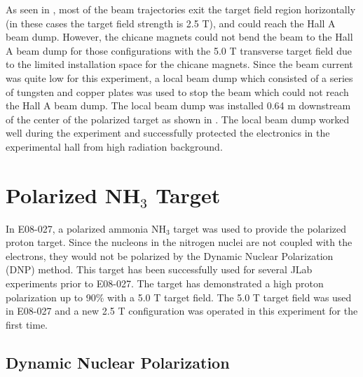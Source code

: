 As seen in , most of the beam trajectories exit the target field region horizontally (in these cases the target field strength is 2.5 T), and could reach the Hall A beam dump. However, the chicane magnets could not bend the beam to the Hall A beam dump for those configurations with the 5.0 T transverse target field due to the limited installation space for the chicane magnets. Since the beam current was quite low for this experiment, a local beam dump which consisted of a series of tungsten and copper plates was used to stop the beam which could not reach the Hall A beam dump. The local beam dump was installed 0.64 m downstream of the center of the polarized target as shown in . The local beam dump worked well during the experiment and successfully protected the electronics in the experimental hall from high radiation background.

\section{\texorpdfstring{Polarized NH${}_3$ Target}{Polarized NH3 Target}}
\label{C5S3}

In E08-027, a polarized ammonia NH${}_3$ target was used to provide the polarized proton target. Since the nucleons in the nitrogen nuclei are not coupled with the electrons, they would not be polarized by the Dynamic Nuclear Polarization (DNP) method. This target has been successfully used for several JLab experiments prior to E08-027. The target has demonstrated a high proton polarization up to 90\% with a 5.0 T target field. The 5.0 T target field was used in E08-027 and a new 2.5 T configuration was operated in this experiment for the first time.

\subsection{Dynamic Nuclear Polarization}
\label{C5S3SS1}

